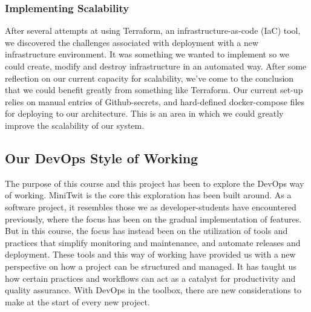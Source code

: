 \subsubsection{Implementing Scalability}
After several attempts at using Terraform, an infrastructure-as-code (IaC) tool, we discovered the challenges associated with deployment with a new infrastructure environment. It was something we wanted to implement so we could create, modify and destroy infrastructure in an automated way. After some reflection on our current capacity for scalability, we've come to the conclusion that we could benefit greatly from something like Terraform.
Our current set-up relies on manual entries of Github-secrets, and hard-defined docker-compose files for deploying to our architecture. This is an area in which we could greatly improve the scalability of our system.

\subsection{Our DevOps Style of Working}
The purpose of this course and this project has been to explore the DevOps way of working. MiniTwit is the core this exploration has been built around. As a software project, it resembles those we as developer-students have encountered previously, where the focus has been on the gradual implementation of features. But in this course, the focus has instead been on the utilization of tools and practices that simplify monitoring and maintenance, and automate releases and deployment. These tools and this way of working have provided us with a new perspective on how a project can be structured and managed. It has taught us how certain practices and workflows can act as a catalyst for productivity and quality assurance.
With DevOps in the toolbox, there are new considerations to make at the start of every new project.